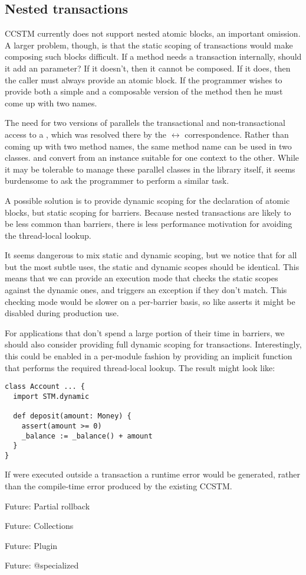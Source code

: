 \color{green}
\subsection{Nested transactions}

CCSTM currently does not support nested atomic blocks, an important
omission.  A larger problem, though, is that the static scoping
of transactions would make composing such blocks difficult.  If a
method  needs a transaction internally, should it add an
  parameter?  If it doesn't, then it
cannot be composed.  If it does, then the caller must always provide
an atomic block.  If the programmer wishes to provide both a simple
and a composable version of the method then he must come up with
two names.

The need for two versions of  parallels the transactional and
non-transactional access to a , which was resolved there by the
 $\leftrightarrow$  correspondence.  Rather than
coming up with two method names, the same method name can be used in
two classes.   and 
convert from an instance suitable for one context to the other.  While it
may be tolerable to manage these parallel classes in the library itself,
it seems burdensome to ask the programmer to perform a similar task.

A possible solution is to provide dynamic scoping for the declaration
of atomic blocks, but static scoping for barriers.  Because nested
transactions are likely to be less common than barriers, there is less
performance motivation for avoiding the thread-local lookup.

It seems dangerous to mix static and dynamic scoping, but we notice that
for all but the most subtle uses, the static and dynamic scopes should be
identical.  This means that we can provide an execution mode that checks
the
static scopes against the dynamic ones, and triggers an exception 
if they don't match.  This checking mode would be slower on a per-barrier
basis, so like asserts it might be disabled during production use.

For applications that don't spend a large portion of their time in barriers, we
should also consider providing full dynamic scoping for transactions.
Interestingly, this could be enabled in a per-module fashion by providing an
implicit function that performs the required thread-local lookup.  The result
might look like:
\lstset{numbers=none}
\begin{lstlisting}
class Account ... {
  import STM.dynamic

  def deposit(amount: Money) {
    assert(amount >= 0)
    _balance := _balance() + amount
  }
}
\end{lstlisting}
\lstset{numbers=left}
If  were executed outside a transaction a runtime error would be
generated, rather than the compile-time error produced by the existing CCSTM.

Future: Partial rollback

Future: Collections

Future: Plugin

Future: @specialized

\color{black}
